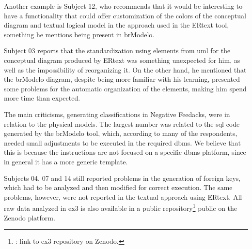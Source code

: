 Another example is Subject 12, who recommends that it would be interesting to have a functionality that could offer customization of the colors of the conceptual diagram and textual logical model in the approach used in the ERtext tool, something he mentions being present in brModelo.

Subject 03 reports that the standardization using elements from \ac{uml} for the conceptual diagram produced by ERtext was something unexpected for him, as well as the impossibility of reorganizing it.
On the other hand, he mentioned that the brModelo diagram, despite being more familiar with his learning, presented some problems for the automatic organization of the elements, making him spend more time than expected.

The main criticisms, generating classifications in Negative Feedacks, were in relation to the physical models.
The largest number was related to the \ac{sql} code generated by the brModelo tool, which, according to many of the respondents, needed small adjustments to be executed in the required \ac{dbms}.
We believe that this is because the instructions are not focused on a specific \ac{dbms} platform, since in general it has a more generic template.

Subjects 04, 07 and 14 still reported problems in the generation of foreign keys, which had to be analyzed and then modified for correct execution.
The same problems, however, were not reported in the textual approach using ERtext.
All raw data analyzed in \ac{ex3} is also available in a public repository\footnote{: link to ex3 repository on Zenodo.} public on the Zenodo platform.

